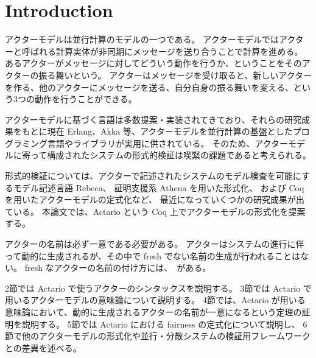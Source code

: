 \section{Introduction}
アクターモデルは並行計算のモデルの一つである。
アクターモデルではアクターと呼ばれる計算実体が非同期にメッセージを送り合うことで計算を進める。
あるアクターがメッセージに対してどういう動作を行うか、ということをそのアクターの振る舞いという。
アクターはメッセージを受け取ると、新しいアクターを作る、他のアクターにメッセージを送る、自分自身の振る舞いを変える、という3つの動作を行うことができる。

アクターモデルに基づく言語は多数提案・実装されてきており、それらの研究成果をもとに現在 Erlang、Akka 等、アクターモデルを並行計算の基盤としたプログラミング言語やライブラリが実用に供されている。
そのため、アクターモデルに寄って構成されたシステムの形式的検証は喫緊の課題であると考えられる。

形式的検証については、アクターで記述されたシステムのモデル検査を可能にするモデル記述言語 Rebeca、
証明支援系 Athena を用いた形式化、
および Coq を用いたアクターモデルの定式化など、
最近になっていくつかの研究成果が出ている。
本論文では、Actario という Coq 上でアクターモデルの形式化を提案する。


アクターの名前は必ず一意である必要がある。
アクターはシステムの進行に伴って動的に生成されるが、その中で fresh でない名前の生成が行われることはない。
fresh なアクターの名前の付け方には、~がある。




2節では Actario で使うアクターのシンタックスを説明する。
3節では Actario で用いるアクターモデルの意味論について説明する。
4節では、Actario が用いる意味論において、動的に生成されるアクターの名前が一意になるという定理の証明を説明する。
5節では Actario における fairness の定式化について説明し、
6節で他のアクターモデルの形式化や並行・分散システムの検証用フレームワークとの差異を述べる。
